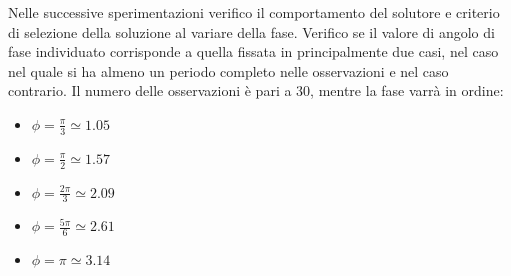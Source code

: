 \documentclass[a4paper,12pt]{report}
\begin{document}
Nelle successive sperimentazioni verifico il comportamento del solutore e criterio di selezione della soluzione al variare della fase. Verifico se il valore di angolo di fase individuato corrisponde a quella fissata in principalmente due casi, nel caso nel quale si ha almeno un periodo completo nelle osservazioni e nel caso contrario. Il numero delle osservazioni è pari a 30, mentre la fase varrà in ordine:
\begin{itemize}
  \item $\phi = \frac{\pi}{3} \simeq 1.05$
  \item $\phi = \frac{\pi}{2} \simeq 1.57$
  \item $\phi = \frac{2\pi}{3} \simeq 2.09$
  \item $\phi = \frac{5\pi}{6} \simeq 2.61$
  \item $\phi = \pi \simeq 3.14$
\end{itemize}
\end{document}
